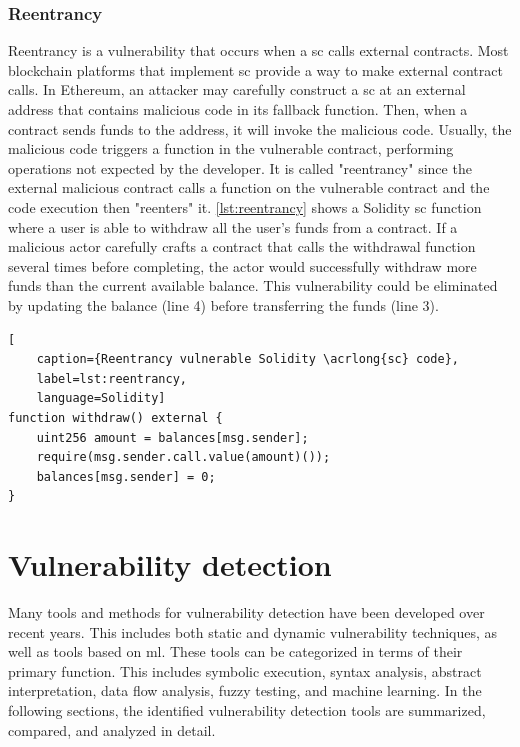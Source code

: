 \subsubsection{Reentrancy}
Reentrancy is a vulnerability that occurs when a \acrshort{sc} calls external contracts. Most blockchain platforms that implement \acrshort{sc} provide a way to make external contract calls. In Ethereum, an attacker may carefully construct a \acrshort{sc} at an external address that contains malicious code in its fallback function. Then, when a contract sends funds to the address, it will invoke the malicious code. Usually, the malicious code triggers a function in the vulnerable contract, performing operations not expected by the developer. It is called "reentrancy" since the external malicious contract calls a function on the vulnerable contract and the code execution then "reenters" it. \cref{lst:reentrancy} shows a Solidity \acrshort{sc} function where a user is able to withdraw all the user's funds from a contract. If a malicious actor carefully crafts a contract that calls the withdrawal function several times before completing, the actor would successfully withdraw more funds than the current available balance. This vulnerability could be eliminated by updating the balance (line 4) before transferring the funds (line 3).

\begin{lstlisting}[
    caption={Reentrancy vulnerable Solidity \acrlong{sc} code},
    label=lst:reentrancy,
    language=Solidity]
function withdraw() external {
    uint256 amount = balances[msg.sender];
    require(msg.sender.call.value(amount)());
    balances[msg.sender] = 0;
}   
\end{lstlisting}



\section{Vulnerability detection}
\label{sec:vulnerability-detection}
Many tools and methods for vulnerability detection have been developed over recent years. This includes both static and dynamic vulnerability techniques, as well as tools based on \acrfull{ml}. These tools can be categorized in terms of their primary function. This includes symbolic execution, syntax analysis, abstract interpretation, data flow analysis, fuzzy testing, and machine learning. In the following sections, the identified vulnerability detection tools are summarized, compared, and analyzed in detail.

